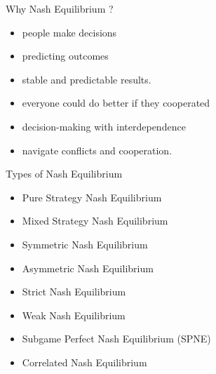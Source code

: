 \documentclass{beamer}
\begin{document}
\begin{frame}{Why Nash Equilibrium ? }

        \begin{itemize}
        \item      people make decisions 
        \item<2->  predicting outcomes 
        \item<3->  stable and predictable results.
        \item<4->  everyone could do better if they cooperated 
        \item<5->decision-making with interdependence
        \item<6->navigate conflicts and cooperation.

    \end{itemize}

\end{frame}

\begin{frame}
\end{frame}




\begin{frame}{Types of Nash Equilibrium}
    \begin{itemize}
        \item  Pure Strategy Nash Equilibrium
        \item<2->Mixed Strategy Nash Equilibrium 
        \item<3->Symmetric Nash Equilibrium
        \item<4->Asymmetric Nash Equilibrium
        \item<5->Strict Nash Equilibrium
        \item<6->Weak Nash Equilibrium
        \item<7->Subgame Perfect Nash Equilibrium (SPNE)
        \item<8->Correlated Nash Equilibrium
    \end{itemize}
\end{frame}
\end{document}
